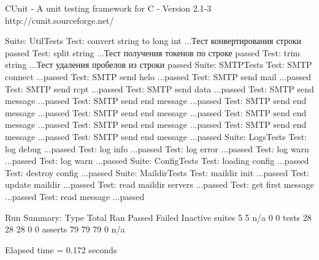 

     CUnit - A unit testing framework for C - Version 2.1-3
     http://cunit.sourceforge.net/


Suite: UtilTests
  Test: convert string to long int ...Тест конвертирования строки
passed
  Test: split string ...Тест получения токенов по строке
passed
  Test: trim string ...Тест удаления пробелов из строки
passed
Suite: SMTPTests
  Test: SMTP connect ...passed
  Test: SMTP send helo ...passed
  Test: SMTP send mail ...passed
  Test: SMTP send rcpt ...passed
  Test: SMTP send data ...passed
  Test: SMTP send message ...passed
  Test: SMTP send end message ...passed
  Test: SMTP send end message ...passed
  Test: SMTP send end message ...passed
  Test: SMTP send end message ...passed
  Test: SMTP send end message ...passed
  Test: SMTP send end message ...passed
  Test: SMTP send end message ...passed
Suite: LogsTests
  Test: log debug ...passed
  Test: log info ...passed
  Test: log error ...passed
  Test: log warn ...passed
  Test: log warn ...passed
Suite: ConfigTests
  Test: loading config ...passed
  Test: destroy config ...passed
Suite: MaildirTests
  Test: maildir init ...passed
  Test: update maildir ...passed
  Test: read maildir servers ...passed
  Test: get first message ...passed
  Test: read message ...passed

Run Summary:    Type  Total    Ran Passed Failed Inactive
              suites      5      5    n/a      0        0
               tests     28     28     28      0        0
             asserts     79     79     79      0      n/a

Elapsed time =    0.172 seconds
